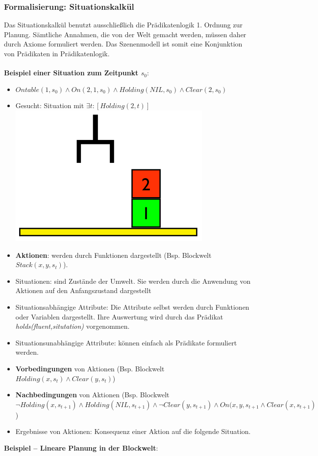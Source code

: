 \subsubsection{Formalisierung: Situationskalkül}
Das Situationskalkül benutzt ausschließlich die Prädikatenlogik 1. Ordnung zur Planung.
Sämtliche Annahmen, die von der Welt gemacht werden, müssen daher durch Axiome formuliert werden.
Das Szenenmodell ist somit eine Konjunktion von Prädikaten in Prädikatenlogik.\\ \\
\textbf{Beispiel einer Situation zum Zeitpunkt $s_0$}:
\begin{itemize}
	\item[] $Ontable(1, s_0) \land On(2, 1, s_0) \land Holding(NIL, s_0) \land Clear(2, s_0)$
	\item[] Gesucht: Situation mit $\exists t: \left[Holding(2, t)\right]$\\
	\includegraphics[width=.2\textwidth]{figures/ch06_sk-bsp.png}
\end{itemize}
\begin{itemize}
	\item \textbf{Aktionen}: werden durch Funktionen dargestellt (Bsp. Blockwelt $Stack(x,y,s_t)$).
	\item Situationen: sind Zustände der Umwelt.
	Sie werden durch die Anwendung von Aktionen auf den Anfangszustand dargestellt
	\item Situationsabhängige Attribute: Die Attribute selbst werden durch Funktionen oder Variablen dargestellt.
	Ihre Auswertung wird durch das Prädikat \emph{holds(fluent,situtation)} vorgenommen.
	\item Situationsunabhängige Attribute: können einfach als Prädikate formuliert werden.
	\item \textbf{Vorbedingungen} von Aktionen (Bsp. Blockwelt $Holding(x,s_t) \wedge Clear(y,s_t)$)
	\item \textbf{Nachbedingungen} von Aktionen (Bsp. Blockwelt $\neg Holding(x, s_{t+1}) \wedge Holding(NIL, s_{t+1}) \wedge \neg Clear(y, s_{t+1}) \wedge On(x,y,s_{t+1} \wedge Clear(x, s_{t+1})$)
	\item Ergebnisse von Aktionen: Konsequenz einer Aktion auf die folgende Situation.
\end{itemize}
\textbf{Beispiel -- Lineare Planung in der Blockwelt}:
